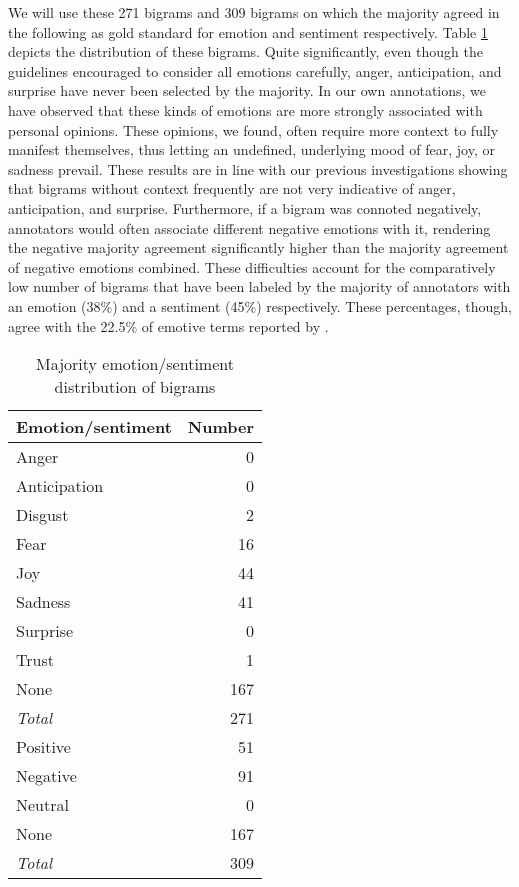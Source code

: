 We will use these 271 bigrams and 309 bigrams on which the majority agreed in the following as gold standard for emotion and sentiment respectively. Table \ref{tab:bigrams-majority-number-emotion-sentiment} depicts the distribution of these bigrams. Quite significantly, even though the guidelines encouraged to consider all emotions carefully, anger, anticipation, and surprise have never been selected by the majority. In our own annotations, we have observed that these kinds of emotions are more strongly associated with personal opinions. These opinions, we found, often require more context to fully manifest themselves, thus letting an undefined, underlying mood of fear, joy, or sadness prevail. These results are in line with our previous investigations showing that bigrams without context frequently are not very indicative of anger, anticipation, and surprise. Furthermore, if a bigram was connoted negatively, annotators would often associate different negative emotions with it, rendering the negative majority agreement significantly higher than the majority agreement of negative emotions combined. These difficulties account for the comparatively low number of bigrams that have been labeled by the majority of annotators with an emotion (38\%) and a sentiment (45\%) respectively. These percentages, though, agree with the 22.5\% of emotive terms reported by \citeauthor{nrc}.

\begin{table}
\centering
\begin{tabular}{l|r}
\textbf{Emotion/sentiment} & \textbf{Number}\\\hline
Anger & 0\\
Anticipation & 0\\
Disgust & 2\\
Fear & 16\\
Joy & 44\\
Sadness & 41\\
Surprise & 0\\
Trust & 1\\
None & 167 \\\hline
\textit{Total} & 271\\\hline
Positive & 51\\
Negative & 91\\
Neutral & 0\\
None & 167\\\hline
\textit{Total} & 309
\end{tabular}
\caption{Majority emotion/sentiment distribution of bigrams}
\label{tab:bigrams-majority-number-emotion-sentiment}
\end{table}

